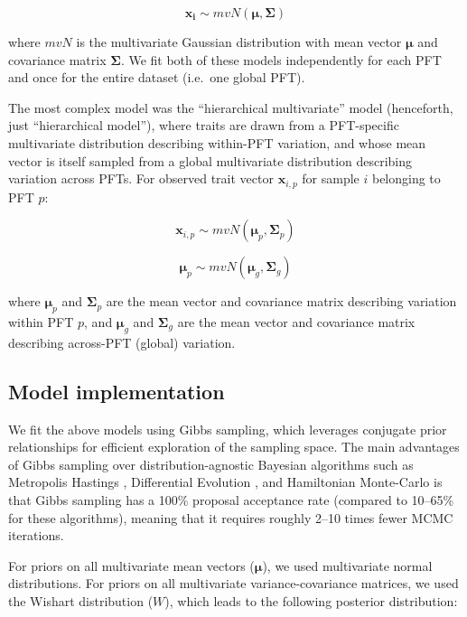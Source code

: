 \documentclass{article}
\begin{document}
\begin{equation}
\bm{x_i} \sim mvN(\bm{\mu}, \bm{\Sigma})
\end{equation}

where $mvN$ is the multivariate Gaussian distribution with mean vector $\bm{\mu}$ and covariance matrix $\bm{\Sigma}$.
We fit both of these models independently for each PFT and once for the entire dataset (i.e.\ one global PFT).

The most complex model was the ``hierarchical multivariate'' model (henceforth, just ``hierarchical model''),
where traits are drawn from a PFT-specific multivariate distribution describing within-PFT variation,
and whose mean vector is itself sampled from a global multivariate distribution describing variation across PFTs.
For observed trait vector $\bm{x}_{i,p}$ for sample $i$ belonging to PFT $p$:

\begin{equation}
\bm{x}_{i,p} \sim mvN(\bm{\mu}_p, \bm{\Sigma}_p)
\end{equation}

\begin{equation}
\bm{\mu}_p \sim mvN(\bm{\mu}_g, \bm{\Sigma}_g)
\end{equation}

where $\bm{\mu}_p$ and $\bm{\Sigma}_p$ are the mean vector and covariance matrix describing variation within PFT $p$, and $\bm{\mu}_g$ and $\bm{\Sigma}_g$ are the mean vector and covariance matrix describing across-PFT (global) variation.

\subsection{Model implementation}

We fit the above models using Gibbs sampling, which leverages conjugate prior relationships for efficient exploration of the sampling space.
The main advantages of Gibbs sampling over distribution-agnostic Bayesian algorithms such as Metropolis Hastings \citep{haario_2001_adaptive}, Differential Evolution \citep{terbraak_2008_differential}, and Hamiltonian Monte-Carlo \citep{neal_2011_hmc} is that Gibbs sampling has a 100\% proposal acceptance rate (compared to 10--65\% for these algorithms), meaning that it requires roughly 2--10 times fewer MCMC iterations.

For priors on all multivariate mean vectors ($\bm{\mu}$), we used multivariate normal distributions.
For priors on all multivariate variance-covariance matrices, we used the Wishart distribution ($W$), which leads to the following posterior distribution:
\end{document}
